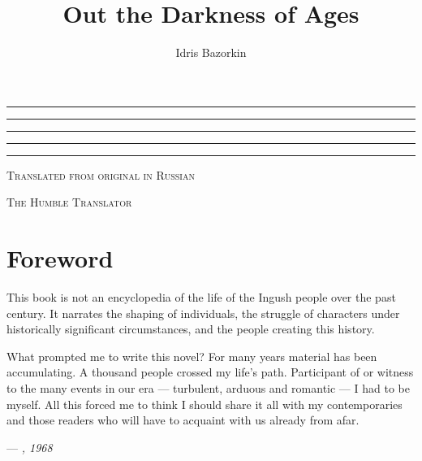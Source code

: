 \documentclass[smalldemyvopaper,11pt,twoside,onecolumn,openright,extrafontsizes]{memoir}
\title{Out the Darkness of Ages}
\author{Idris Bazorkin}
\newcommand{\ISBN}{0-000-00000-2}
\newcommand{\press}{The Humble Translator}
\newcommand{\translation}{Translated from original in Russian}
\newcommand*\halftitlepage{\begingroup %
  \setlength\drop{0.1\textheight}
  \begin{center}

  \vspace*{\drop}
  \rule{\textwidth}{0in}\par
  {\Large\textsc\thetitle\par}
  \rule{\textwidth}{0in}\par
  \vfill
  \end{center}
\endgroup}
\newlength\drop
\newcommand*\titleM{\begingroup %
  \setlength\drop{0.15\textheight}
  \begin{center}
  \vspace*{\drop}
  \rule{\textwidth}{0in}\par
  {\HUGE\textsc\thetitle\par}
  \rule{\textwidth}{0in}\par
  {\Large\textit\theauthor\par}
  \rule{\textwidth}{0in}\par
  {\Large\scshape\translation\par}
  \vfill
  {\Large\scshape\press}
  \end{center}
\endgroup}
\begin{document}
\pagestyle{empty}
\halftitlepage
\cleardoublepage

\titleM

%

\frontmatter
\pagestyle{mystyle}
\chapter*{Foreword}
This book is not an encyclopedia of the life of the Ingush people over the
past century. It narrates the shaping of individuals, the struggle of characters
under historically significant circumstances, and the people creating this
history.\par What prompted me to write this novel? For many years material has been
accumulating. A thousand people crossed my life’s path. Participant of or witness
to the many events in our era — turbulent, arduous and romantic — I
had to be myself. All this forced me to think I should share it all with my
contemporaries and those readers who will have to acquaint with us already from
afar. 
\medskip
\begin {flushright}
--- \textit{\theauthor, 1968}
\end {flushright}
\end{document}
